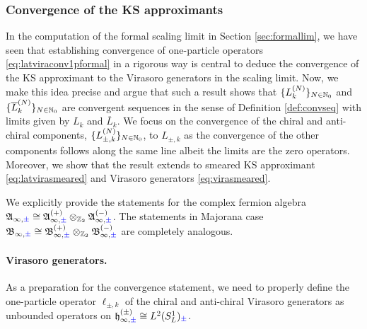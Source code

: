 \documentclass[a4paper, 11pt]{article}
\newcommand{\fA}{\mathfrak{A}}\newcommand{\cA}{\mathcal{A}}\newcommand{\dA}{\mathds{A}}\newcommand{\sA}{\mathscr{A}}
\newcommand{\fB}{\mathfrak{B}}\newcommand{\cB}{\mathcal{B}}\newcommand{\dB}{\mathds{B}}\newcommand{\sB}{\mathscr{B}}
\newcommand{\fh}{\mathfrak{h}}
\DeclareMathOperator{\1}{\mathds{1}}
\begin{document}
\subsubsection{Convergence of the KS approximants}
\label{sec:KSconv}
In the computation of the formal scaling limit in Section \ref{sec:formallim}, we have seen that establishing convergence of one-particle operators \eqref{eq:latviraconv1pformal} in a rigorous way is central to deduce the convergence of the KS approximant to the Virasoro generators in the scaling limit. Now, we make this idea precise and argue that such a result shows that $\{L^{(N)}_{k}\}_{N\in\mathbb{N}_{0}}$ and $\{\overline{L}^{(N)}_{k}\}_{N\in\mathbb{N}_{0}}$ are convergent sequences in the sense of Definition \ref{def:convseq} with limits given by $L_{k}$ and $\overline{L}_{k}$. We focus on the convergence of the chiral and anti-chiral components, $\{L^{(N)}_{\pm, k}\}_{N\in\mathbb{N}_{0}}$, to $L_{\pm,k}$ as the convergence of the other components follows along the same line albeit the limits are the zero operators. Moreover, we show that the result extends to smeared KS approximant \eqref{eq:latvirasmeared} and Virasoro generators \eqref{eq:virasmeared}.

\medskip

We explicitly provide the statements for the complex fermion algebra $\fA_{\infty,{\color{blue}\pm}}\cong\fA^{(+)}_{\infty,{\color{blue}\pm}}\otimes_{\Z_{2}}\fA^{(-)}_{\infty,{\color{blue}\pm}}$. The statements in Majorana case $\fB_{\infty,{\color{blue}\pm}}\cong\fB^{(+)}_{\infty,{\color{blue}\pm}}\otimes_{\Z_{2}}\fB^{(-)}_{\infty,{\color{blue}\pm}}$ are completely analogous.

\paragraph{Virasoro generators.} As a preparation for the convergence statement, we need to properly define the one-particle operator $\ell_{\pm,k}$ of the chiral and anti-chiral Virasoro generators as unbounded operators on $\fh^{(\pm)}_{\infty,{\color{blue}\pm}}\cong L^{2}(S^{1}_{L})_{{\color{blue}\pm}}$.
\end{document}

